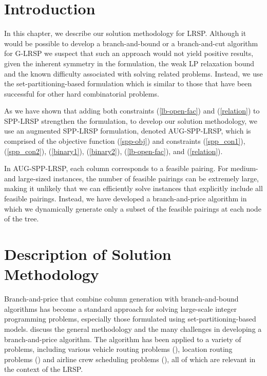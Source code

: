 \section{Introduction}

In this chapter, we describe our solution methodology for
LRSP. Although it would be possible to develop a branch-and-bound 
or a branch-and-cut algorithm for G-LRSP we suspect that such an 
approach would not yield positive results, given the inherent 
symmetry in the formulation, the weak LP relaxation bound and 
the known difficulty associated with solving related problems.
Instead, we use the set-partitioning-based formulation which is 
similar to those that have been successful for other hard 
combinatorial problems. 

As we have shown that adding both constraints (\ref{lb-open-fac}) 
and (\ref{relation}) to SPP-LRSP strengthen the formulation, 
to develop our solution methodology, we use an augmented SPP-LRSP 
formulation, denoted AUG-SPP-LRSP, which is comprised of the 
objective function (\ref{spp-obj}) and constraints (\ref{spp_con1}), 
(\ref{spp_con2}), (\ref{binary1}), (\ref{binary2}), (\ref{lb-open-fac}), 
and (\ref{relation}). 

In AUG-SPP-LRSP, each column corresponds to a feasible pairing.  
For medium- and large-sized instances, the number of feasible pairings 
can be extremely large, making it unlikely that we can efficiently solve 
instances that explicitly include all feasible pairings. Instead, we have 
developed a branch-and-price algorithm in which we dynamically generate 
only a subset of the feasible pairings at each node of the tree.


\section{Description of Solution Methodology} 
Branch-and-price that combine column generation with branch-and-bound 
algorithms has become a standard approach for solving large-scale 
integer programming  problems, especially those formulated using 
set-partitioning-based models. 
\citet{Barnhart} discuss the general methodology and the many  
challenges in developing a branch-and-price algorithm. The algorithm has been 
applied to a variety of problems, including various vehicle routing problems 
(\citet{Fukasawa}), location routing problems (\citet{Berger07}) and  
airline crew scheduling problems (\citet{Vance}), all of which are relevant in the 
context of the LRSP.

